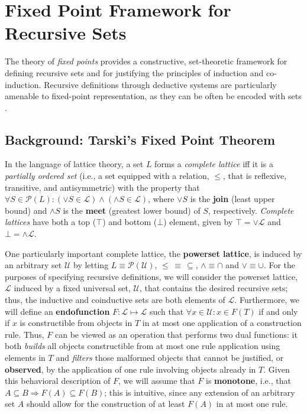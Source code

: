 \section{Fixed Point Framework for Recursive Sets}
\label{sec-fix}
The theory of \textit{fixed points} provides a constructive, set-theoretic framework for defining recursive sets and for justifying the principles of induction and co-induction. Recursive definitions through deductive systems are particularly amenable to fixed-point representation, as they can be often be encoded with sets \cite{Sangiorgi2011}. 

\subsection{Background: Tarski's Fixed Point Theorem}
In the language of lattice theory, a set $L$ forms a \textit{complete lattice} iff it is a \textit{partially ordered set} (i.e., a set equipped with a relation, $\leq$, that is reflexive, transitive, and antisymmetric) with the property that $\forall S \in \mathcal{P}(L): (\vee S \in \mathcal{L}) \wedge (\wedge S \in \mathcal{L})$, where $\vee S$ is the \textbf{join} (least upper bound) and $\wedge S$ is the \textbf{meet} (greatest lower bound) of $S$, respectively. \textit{Complete lattices} have both a top ($\top$) and bottom ($\bot$) element, given by $\top = \vee \mathcal{L}$ and $\bot = \wedge \mathcal{L}$. 

One particularly important complete lattice, the \textbf{powerset lattice}, is induced by an arbitrary set $\mathcal{U}$ by letting $L \equiv \mathcal{P}(\mathcal{U})$, $\leq \, \equiv \, \subseteq$, $\wedge \equiv \cap$ and $\vee \equiv \cup$. For the purposes of specifying recursive definitions, we will consider the powerset lattice, $\mathcal{L}$ induced by a fixed universal set, $\mathcal{U}$, that contains the desired recursive sets; thus, the inductive and coinductive sets are both elements of $\mathcal{L}$. Furthermore, we will define an \textbf{endofunction} $F:\mathcal{L} \mapsto \mathcal{L}$ such that $\forall x \in \mathcal{U}: x \in F(T)$ if and only if $x$ is constructible from objects in $T$ in at most one application of a construction rule. Thus, $F$ can be viewed as an operation that performs two dual functions: it both \textit{builds} all objects constructible from at most one rule application using elements in $T$ and \textit{filters} those malformed objects that cannot be justified, or \textbf{observed}, by the application of one rule involving objects already in $T$. Given this behavioral description of $F$, we will assume that $F$ is \textbf{monotone}, i.e., that $A \subseteq B \Rightarrow F(A) \subseteq F(B)$; this is intuitive, since any extension of an arbitrary set $A$ should allow for the construction of at least $F(A)$ in at most one rule.

